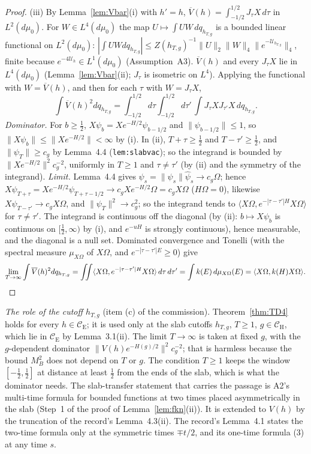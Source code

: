 \documentclass[11pt,a4paper]{article}
\newcommand{\CE}{\mathcal{C}_{\mathrm E}}
\newcommand{\CH}{\mathcal{C}_{\mathrm H}}
\newcommand{\Om}{\Omega}
\newcommand{\ip}[2]{\langle #1,#2\rangle}
\newcommand{\Uc}{\mathcal U}
\newcommand{\dmu}{d\mu_0}
\newcommand{\Vb}{\overline V}                 %
\theoremstyle{plain}
\theoremstyle{definition}
\begin{document}
\begin{proof}
(iii) By Lemma~\ref{lem:Vbar}(i) with $h'=h$, $\Vb(h)=\int_{-1/2}^{1/2}J_\tau X\,d\tau$ in
$L^2(\dmu)$.  For $W\in L^4(\dmu)$ the map $U\mapsto\int UW\,dq_{h_{T,g}}$ is a bounded linear
functional on $L^2(\dmu)$: $|\int UWdq_{h_{T,g}}|\le
Z(h_{T,g})^{-1}\|U\|_2\|W\|_4\|e^{-\Uc_{h_{T,g}}}\|_4$, finite because $e^{-4\Uc_h}\in L^1(\dmu)$
(Assumption~A3).  $\Vb(h)$ and every $J_\tau X$ lie in $L^4(\dmu)$ (Lemma~\ref{lem:Vbar}(ii);
$J_\tau$ is isometric on $L^4$).  Applying the functional with $W=\Vb(h)$, and then for each
$\tau$ with $W=J_\tau X$,
\[
 \int\Vb(h)^2dq_{h_{T,g}}=\int_{-1/2}^{1/2}d\tau\int_{-1/2}^{1/2}d\tau'\,
 \int J_\tau XJ_{\tau'}X\,dq_{h_{T,g}} .
\]
\emph{Dominator.}  For $b\ge\frac12$, $X\psi_b=Xe^{-H/2}\psi_{b-1/2}$ and $\|\psi_{b-1/2}\|\le1$,
so $\|X\psi_b\|\le\|Xe^{-H/2}\|<\infty$ by (i).  In (ii), $T+\tau\ge\frac12$ and
$T-\tau'\ge\frac12$, and $\|\psi_T\|\ge c_g$ by Lemma~4.4 (\texttt{lem:slabvac}); so the
integrand is bounded by $\|Xe^{-H/2}\|^2c_g^{-2}$, uniformly in $T\ge1$ and $\tau\ne\tau'$
(by (ii) and the symmetry of the integrand).  \emph{Limit.}  Lemma~4.4 gives
$\psi_s=\|\psi_s\|\hat\psi_s\to c_g\Om$; hence $X\psi_{T+\tau}=Xe^{-H/2}\psi_{T+\tau-1/2}\to
c_gXe^{-H/2}\Om=c_gX\Om$ ($H\Om=0$), likewise $X\psi_{T-\tau'}\to c_gX\Om$, and
$\|\psi_T\|^2\to c_g^2$; so the integrand tends to $\ip{X\Om}{e^{-|\tau-\tau'|H}X\Om}$ for
$\tau\ne\tau'$.  The integrand is continuous off the diagonal (by (ii): $b\mapsto X\psi_b$ is
continuous on $[\frac12,\infty)$ by (i), and $e^{-uH}$ is strongly continuous), hence
measurable, and the diagonal is a null set.  Dominated convergence and Tonelli (with the spectral
measure $\mu_{X\Om}$ of $X\Om$, and $e^{-|\tau-\tau'|E}\ge0$) give
\[
 \lim_{T\to\infty}\int\Vb(h)^2dq_{h_{T,g}}=\iint\ip{X\Om}{e^{-|\tau-\tau'|H}X\Om}\,d\tau\,d\tau'
 =\int k(E)\,d\mu_{X\Om}(E)=\ip{X\Om}{k(H)X\Om} .\qedhere
\]
\end{proof}

\emph{The role of the cutoff $h_{T,g}$} (item (c) of the commission).  Theorem~\ref{thm:TD4}
holds for every $h\in\CE$; it is used only at the slab cutoffs $h_{T,g}$, $T\ge1$, $g\in\CH$,
which lie in $\CE$ by Lemma~3.1(ii).  The limit $T\to\infty$ is taken at fixed $g$, with the
$g$-dependent dominator $\|V(h)e^{-H(g)/2}\|^2c_g^{-2}$; that is harmless because the bound
$M_B^2$ does not depend on $T$ or $g$.  The condition $T\ge1$ keeps the window
$[-\frac12,\frac12]$ at distance at least $\frac12$ from the ends of the slab, which is what the
dominator needs.  The slab-transfer statement that carries the passage is A2's multi-time
formula for bounded functions at two times placed asymmetrically in the slab (Step~1 of the
proof of Lemma~\ref{lem:fkn}(ii)).  It is extended to $V(h)$ by the truncation of the record's
Lemma~4.3(ii).  The record's Lemma~4.1 states the two-time formula only at the symmetric times
$\mp t/2$, and its one-time formula (3) at any time $s$.
\end{document}
